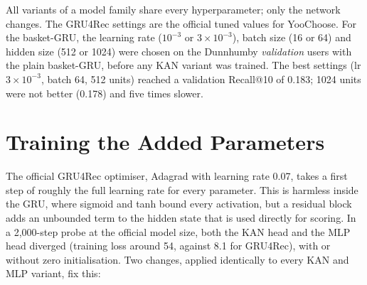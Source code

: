 \documentclass[12pt,a4paper]{report}
\begin{document}
\begin{table}[H]
\centering
\caption{Hyperparameters (mac profile).}
\label{tab:hyper}
\small
{}
\end{table}

All variants of a model family share every hyperparameter; only the network
changes. The GRU4Rec settings are the official tuned values for YooChoose. For
the basket-GRU, the learning rate ($10^{-3}$ or $3\times10^{-3}$), batch size (16
or 64) and hidden size (512 or 1024) were chosen on the Dunnhumby
\emph{validation} users with the plain basket-GRU, before any KAN variant was
trained. The best settings (lr $3\times10^{-3}$, batch 64, 512 units) reached a
validation Recall@10 of 0.183; 1024 units were not better (0.178) and five times
slower.

\section{Training the Added Parameters}
\label{sec:stability}

The official GRU4Rec optimiser, Adagrad with learning rate 0.07, takes a first
step of roughly the full learning rate for every parameter. This is harmless
inside the GRU, where sigmoid and tanh bound every activation, but a residual
block adds an unbounded term to the hidden state that is used directly for
scoring. In a 2,000-step probe at the official model size, both the KAN head and
the MLP head diverged (training loss around 54, against 8.1 for GRU4Rec), with or
without zero initialisation. Two changes, applied identically to every KAN and
MLP variant, fix this:
\end{document}
